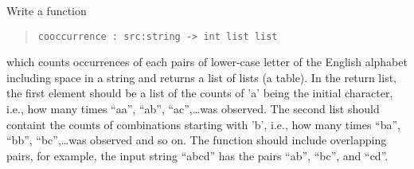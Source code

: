 \label{coocurrence}
Write a function
\begin{quote}
  \mbox{\lstinline!cooccurrence : src:string -> int list list!}
\end{quote}
which counts occurrences of each pairs of lower-case letter of the
English alphabet including space in a string and returns a list of
lists (a table).  In the return list, the first element should be a
list of the counts of 'a' being the initial character, i.e., how many times ``aa'',
``ab'', ``ac'',\ldots was observed. The second list should containt
the counts of combinations starting with 'b', i.e., how many times
``ba'', ``bb'', ``bc'',\ldots was observed and so on. The function
should include overlapping pairs, for example, the input string
``abcd'' has the pairs ``ab'', ``bc'', and ``cd''.

